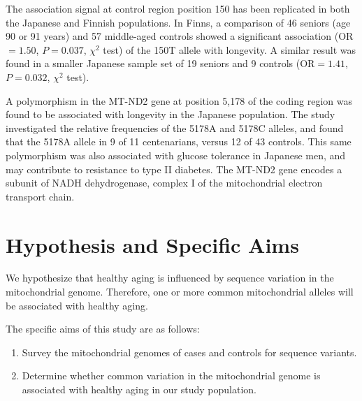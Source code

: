 The association signal at control region position 150 has been replicated in both the Japanese and Finnish populations\cite{niemi2005combination}.  In Finns, a comparison of 46 seniors (age 90 or 91 years) and 57 middle-aged controls showed a significant association (\ac{OR}$=1.50$, $P=0.037$, $\chi^{2}$ test) of the 150T allele with longevity.  A similar result was found in a smaller Japanese sample set of 19 seniors and 9 controls (\ac{OR}$=1.41$, $P=0.032$, $\chi^{2}$ test).

A polymorphism in the MT-ND2 gene at position 5,178 of the coding region was found to be associated with longevity in the Japanese population\cite{Tanaka1998}.  The study investigated the relative frequencies of the 5178A and 5178C alleles, and found that the 5178A allele in 9 of 11 centenarians, versus 12 of 43 controls.  This same polymorphism was also associated with glucose tolerance in Japanese men, and may contribute to resistance to type II diabetes.  The MT-ND2 gene encodes a subunit of \ac{NADH} dehydrogenase, complex I of the mitochondrial electron transport chain.

\section{Hypothesis and Specific Aims}
We hypothesize that healthy aging is influenced by sequence variation in the mitochondrial genome.  Therefore, one or more common mitochondrial alleles will be associated with healthy aging.

The specific aims of this study are as follows:

\begin{enumerate}
\item Survey the mitochondrial genomes of cases and controls for sequence variants.
\item Determine whether common variation in the mitochondrial genome is associated with healthy aging in our study population.
\end{enumerate}

\newpage
